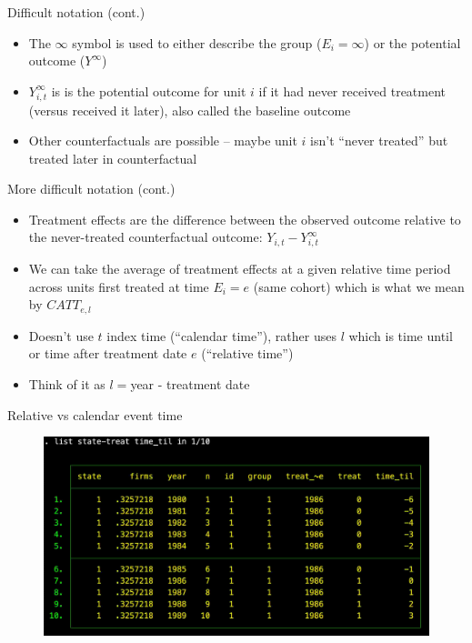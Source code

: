 \documentclass{beamer}
\begin{document}
\begin{frame}{Difficult notation (cont.)}

\begin{itemize}
\item The $\infty$ symbol is used to either describe the group ($E_i=\infty$) or the potential outcome ($Y^{\infty}$)
\item $Y^{\infty}_{i,t}$ is is the potential outcome for unit $i$ if it had never received treatment (versus received it later), also called the baseline outcome
\item Other counterfactuals are possible -- maybe unit $i$ isn't ``never treated'' but treated later in counterfactual
\end{itemize}
\end{frame}

\begin{frame}{More difficult notation (cont.)}

\begin{itemize}
\item Treatment effects are the difference between the observed outcome relative to the never-treated counterfactual outcome: $Y_{i,t} - Y^{\infty}_{i,t}$
\item We can take the average of treatment effects at a given relative time period across units first treated at time $E_i=e$ (same cohort) which is what we mean by $CATT_{e,l}$
\item Doesn't use $t$ index time (``calendar time''), rather uses $l$ which is time until or time after treatment date $e$ (``relative time'')
\item Think of it as ${l}=$year - treatment date
\end{itemize}

\end{frame}

\begin{frame}{Relative vs calendar event time}


\begin{figure}
\includegraphics[scale=0.2]{./lecture_includes/timetil}
\end{figure}

\end{frame}
\end{document}
